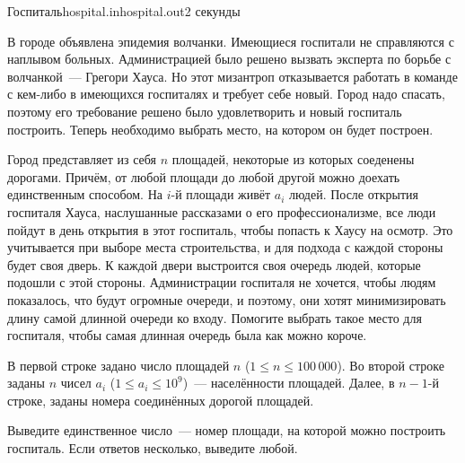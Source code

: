 \begin{problem}{Госпиталь}{hospital.in}{hospital.out}{2 секунды}


В городе объявлена эпидемия волчанки. Имеющиеся госпитали не справляются
с наплывом больных. Администрацией было решено вызвать эксперта по 
борьбе с волчанкой~--- Грегори Хауса. Но этот мизантроп отказывается 
работать в команде с кем-либо в имеющихся госпиталях и требует себе 
новый. Город надо спасать, поэтому его требование решено было удовлетворить
и новый госпиталь построить. Теперь необходимо выбрать место, на
котором он будет построен.

Город представляет из себя $n$ площадей, некоторые из которых 
соеденены дорогами. Причём, от любой площади до любой другой можно
доехать единственным способом. На $i$-й площади живёт $a_i$ людей. 
После открытия госпиталя Хауса, наслушанные рассказами о его профессионализме,
все люди пойдут в день открытия в этот госпиталь, чтобы попасть к Хаусу
на осмотр. Это учитывается при выборе места строительства, и для 
подхода с каждой стороны будет своя дверь. К каждой двери выстроится 
своя очередь людей, которые подошли с этой стороны. Администрации
госпиталя не хочется, чтобы людям показалось, что будут огромные очереди,
и поэтому, они хотят минимизировать длину самой длинной очереди 
ко входу. Помогите выбрать такое место для госпиталя, чтобы самая длинная
очередь была как можно короче.

\InputFile
В первой строке задано число площадей $n$ ($1 \le n \le 100{\,}000$).
Во второй строке заданы $n$ чисел $a_i$ ($1 \le a_i \le 10^9$)~--- 
населённости площадей.
Далее, в $n-1$-й строке, заданы номера соединённых дорогой площадей.

\OutputFile               
Выведите единственное число~--- номер площади, на которой можно 
построить госпиталь. Если ответов несколько, выведите любой.

\Examples
\begin{example}%
%
\end{example}

\end{problem}

